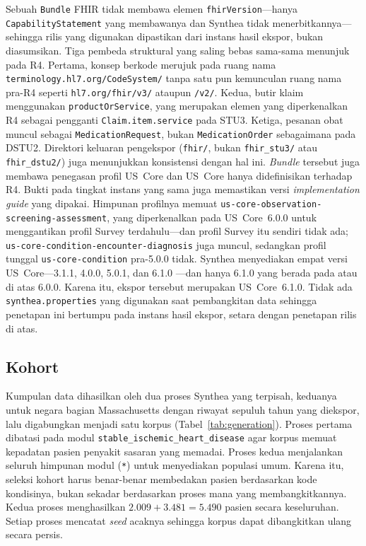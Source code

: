 Sebuah \texttt{Bundle} FHIR tidak membawa elemen \texttt{fhirVersion}---hanya
\texttt{CapabilityStatement} yang membawanya dan Synthea tidak menerbitkannya---sehingga
rilis yang digunakan dipastikan dari instans hasil ekspor, bukan diasumsikan. Tiga pembeda
struktural yang saling bebas sama-sama menunjuk pada R4. Pertama, konsep berkode merujuk pada
ruang nama \texttt{terminology.hl7.org/CodeSystem/} tanpa satu pun kemunculan ruang nama
pra-R4 seperti \texttt{hl7.org/fhir/v3/} ataupun \texttt{/v2/}. Kedua, butir klaim menggunakan
\texttt{productOrService}, yang merupakan elemen yang diperkenalkan R4 sebagai pengganti
\texttt{Claim.item.service} pada STU3. Ketiga, pesanan obat muncul sebagai
\texttt{MedicationRequest}, bukan \texttt{MedicationOrder} sebagaimana pada DSTU2. Direktori
keluaran pengekspor (\texttt{fhir/}, bukan \texttt{fhir\_stu3/} atau \texttt{fhir\_dstu2/})
juga menunjukkan konsistensi dengan hal ini. \emph{Bundle} tersebut juga membawa penegasan profil US~Core dan
US~Core hanya didefinisikan terhadap R4.
Bukti pada tingkat instans yang sama juga memastikan versi \emph{implementation guide} yang
dipakai. Himpunan profilnya memuat \texttt{us-core-observation-screening-assessment}, yang
diperkenalkan pada US~Core~6.0.0 untuk menggantikan profil Survey terdahulu---dan profil Survey
itu sendiri tidak ada; \texttt{us-core-condition-encounter-diagnosis} juga muncul, sedangkan profil
tunggal \texttt{us-core-condition} pra-5.0.0 tidak. Synthea menyediakan empat versi
US~Core---3.1.1, 4.0.0, 5.0.1, dan 6.1.0 \cite{synthea_fhir_wiki}---dan hanya 6.1.0 yang berada
pada atau di atas 6.0.0. Karena itu, ekspor tersebut merupakan US~Core~6.1.0. Tidak ada
\texttt{synthea.properties} yang digunakan saat pembangkitan data sehingga
penetapan ini bertumpu pada instans hasil ekspor, setara dengan penetapan rilis di atas.

\subsection{Kohort}
\label{sec:cohort}
Kumpulan data dihasilkan oleh dua proses Synthea yang terpisah, keduanya untuk
negara bagian Massachusetts dengan riwayat sepuluh tahun yang diekspor, lalu digabungkan
menjadi satu korpus (Tabel~\ref{tab:generation}). Proses pertama dibatasi pada modul \texttt{stable\_ischemic\_heart\_disease} agar korpus
memuat kepadatan pasien penyakit sasaran yang memadai. Proses kedua menjalankan seluruh
himpunan modul (\texttt{*}) untuk menyediakan populasi umum. Karena itu, seleksi kohort
harus benar-benar membedakan pasien berdasarkan kode kondisinya, bukan sekadar berdasarkan
proses mana yang membangkitkannya. Kedua proses menghasilkan
$2{.}009 + 3{.}481 = 5{.}490$ pasien secara keseluruhan. Setiap proses mencatat
\emph{seed} acaknya sehingga korpus dapat dibangkitkan ulang secara persis.

